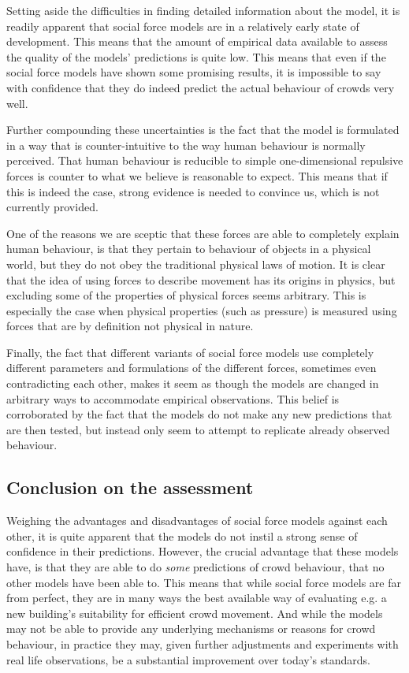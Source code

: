 Setting aside the difficulties in finding detailed information about the 
model, it is readily apparent that social force models are in a relatively 
early state of development. This means that the amount of empirical data 
available to assess the quality of the models' predictions is quite low. This 
means that even if the social force models have shown some promising results, 
it is impossible to say with confidence that they do indeed predict the actual 
behaviour of crowds very well.

Further compounding these uncertainties is the fact that the model is 
formulated in a way that is counter-intuitive to the way human behaviour is 
normally perceived. That human behaviour is reducible to simple 
one-dimensional repulsive forces is counter to what we believe is reasonable 
to expect. This means that if this is indeed the case, strong evidence is 
needed to convince us, which is not currently provided.

One of the reasons we are sceptic that these forces are able to completely 
explain human behaviour, is that they pertain to behaviour of objects in a 
physical world, but they do not obey the traditional physical laws of motion.  
It is clear that the idea of using forces to describe movement has its origins 
in physics, but excluding some of the properties of physical forces seems 
arbitrary. This is especially the case when physical properties (such as 
pressure) is measured using forces that are by definition not physical in 
nature.

Finally, the fact that different variants of social force models use 
completely different parameters and formulations of the different forces, 
sometimes even contradicting each other, makes it seem as though the models 
are changed in arbitrary ways to accommodate empirical observations. This 
belief is corroborated by the fact that the models do not make any new 
predictions that are then tested, but instead only seem to attempt to 
replicate already observed behaviour.

\subsection{Conclusion on the assessment}
Weighing the advantages and disadvantages of social force models against each 
other, it is quite apparent that the models do not instil a strong sense of 
confidence in their predictions. However, the crucial advantage that these 
models have, is that they are able to do \emph{some} predictions of crowd 
behaviour, that no other models have been able to. This means that while 
social force models are far from perfect, they are in many ways the best 
available way of evaluating e.g. a new building's suitability for efficient 
crowd movement. And while the models may not be able to provide any underlying 
mechanisms or reasons for crowd behaviour, in practice they may, given further 
adjustments and experiments with real life observations, be a substantial 
improvement over today's standards.
